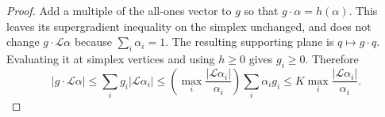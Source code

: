 \begin{proof}
Add a multiple of the all-ones vector to \(g\) so that
\(g\cdot\alpha=h(\alpha)\).  This leaves its supergradient inequality
on the simplex unchanged, and does not change \(g\cdot\mathcal L\alpha\)
because \(\sum_i\alpha_i=1\).  The resulting supporting plane is
\(q\mapsto g\cdot q\).  Evaluating it at simplex vertices and using
\(h\geq0\) gives \(g_i\geq0\).  Therefore
\[
 |g\cdot\mathcal L\alpha|
 \leq\sum_i g_i|\mathcal L\alpha_i|
 \leq\left(\max_i\frac{|\mathcal L\alpha_i|}{\alpha_i}\right)
       \sum_i\alpha_i g_i
 \leq K\max_i\frac{|\mathcal L\alpha_i|}{\alpha_i}.
\]
\end{proof}
